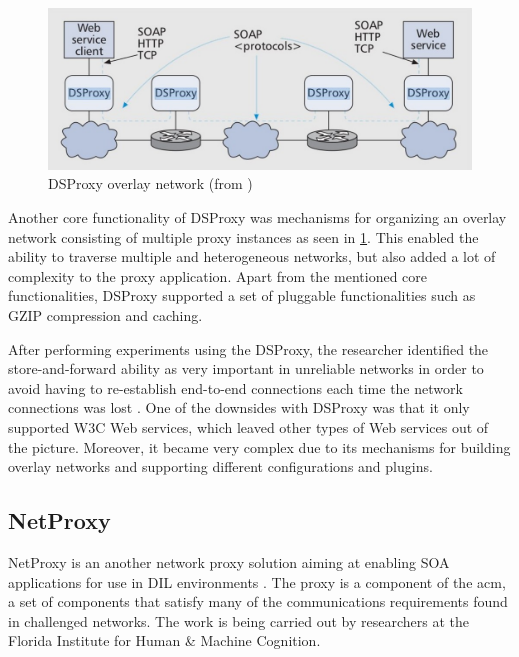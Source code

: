 \begin{figure}[h]
\includegraphics[scale=0.35]{images/dsproxy.pdf}
\caption{DSProxy overlay network (from \cite{ieee-dsproxy} )}
\label{figure:dsproxy}
\end{figure}

Another core functionality of DSProxy was mechanisms for organizing an overlay
network consisting of multiple proxy instances as seen in \cref{figure:dsproxy}.
This enabled the ability to traverse multiple and heterogeneous networks, but
also added a lot of complexity to the proxy application. Apart from the
mentioned core functionalities, DSProxy supported a set of pluggable
functionalities such as GZIP compression and caching.

After performing experiments using the DSProxy, the researcher identified the
store-and-forward ability as very important in unreliable networks in order to
avoid having to re-establish end-to-end connections each time the network
connections was lost \cite{dsproxy-ffi}. One of the downsides with DSProxy was that it
only supported W3C Web services, which leaved other types of Web services out of
the picture. Moreover, it became very complex due to its mechanisms for building
overlay networks and supporting different configurations and plugins.

\subsection{NetProxy}

NetProxy is an another network proxy solution aiming at enabling SOA
applications for use in DIL environments \cite{suri-netproxy}. The proxy is a
component of the \gls{acm}, a set of components that satisfy many of the
communications requirements found in challenged networks. The work is being
carried out by researchers at the Florida Institute for Human \& Machine
Cognition.

